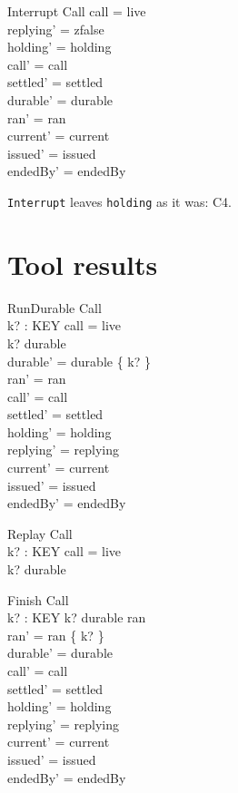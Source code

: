 \documentclass[a4paper,10pt,fleqn]{article}
\begin{document}
\begin{schema}{Interrupt}
  \Delta Call
\where
  call = live \\
  replying' = zfalse \\
  holding' = holding \\
  call' = call \\
  settled' = settled \\
  durable' = durable \\
  ran' = ran \\
  current' = current \\
  issued' = issued \\
  endedBy' = endedBy
\end{schema}

\texttt{Interrupt} leaves \texttt{holding} as it was: C4.

\section{Tool results}

\begin{schema}{RunDurable}
  \Delta Call \\
  k? : KEY
\where
  call = live \\
  k? \notin durable \\
  durable' = durable \cup \{ k? \} \\
  ran' = ran \\
  call' = call \\
  settled' = settled \\
  holding' = holding \\
  replying' = replying \\
  current' = current \\
  issued' = issued \\
  endedBy' = endedBy
\end{schema}

\begin{schema}{Replay}
  \Xi Call \\
  k? : KEY
\where
  call = live \\
  k? \in durable
\end{schema}

\begin{schema}{Finish}
  \Delta Call \\
  k? : KEY
\where
  k? \in durable \setminus ran \\
  ran' = ran \cup \{ k? \} \\
  durable' = durable \\
  call' = call \\
  settled' = settled \\
  holding' = holding \\
  replying' = replying \\
  current' = current \\
  issued' = issued \\
  endedBy' = endedBy
\end{schema}
\end{document}
